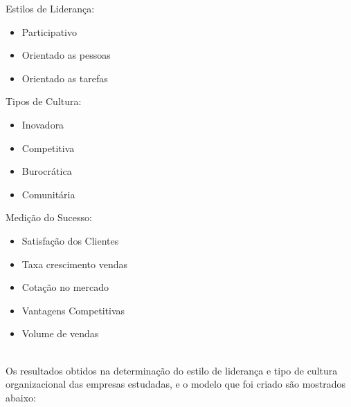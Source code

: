 {\begin{minipage}[t]{.3\linewidth}
\quad Estilos de Liderança:
\begin{itemize}
\setlength\itemsep{-0.3em}
\item Participativo
\item Orientado as pessoas
\item Orientado as tarefas
\end{itemize}
\end{minipage}
\begin{minipage}[t]{.3\linewidth}
\quad Tipos de Cultura:
\begin{itemize}
\setlength\itemsep{-0.3em}
\item Inovadora
\item Competitiva
\item Burocrática
\item Comunitária
\end{itemize}
\end{minipage}
\begin{minipage}[t]{.3\linewidth}
\quad Medição do Sucesso:
\begin{itemize}
\setlength\itemsep{-0.3em}
\item Satisfação dos Clientes
\item Taxa crescimento vendas
\item Cotação no mercado
\item Vantagens Competitivas
\item Volume de vendas
\end{itemize}
\end{minipage}
\vspace{1cm}\\

Os resultados obtidos na determinação do estilo de liderança e tipo de cultura organizacional das empresas estudadas, e o modelo que foi criado são mostrados abaixo:\\
\\

}
